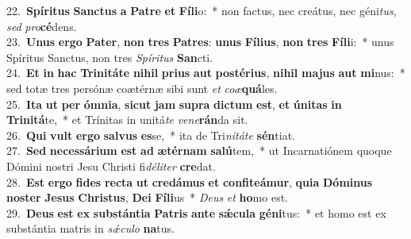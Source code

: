 {22.~}\textbf{Spí}\textbf{ri}\textbf{tus} \textbf{San}\textbf{ctus} \textbf{a} \textbf{Pa}\textbf{tre} \textbf{et} \textbf{Fí}\textbf{li}o:~* non factus, nec creátus, nec géni\textit{tus}, \textit{sed} \textit{pro}\textbf{cé}dens.\\
{23.~}\textbf{U}\textbf{nus} \textbf{er}\textbf{go} \textbf{Pa}\textbf{ter}, \textbf{non} \textbf{tres} \textbf{Pa}\textbf{tres}: \textbf{u}\textbf{nus} \textbf{Fí}\textbf{li}\textbf{us}, \textbf{non} \textbf{tres} \textbf{Fí}\textbf{li}i:~* unus Spíritus Sanctus, non tres \textit{Spí}\textit{ri}\textit{tus} \textbf{San}cti.\\
{24.~}\textbf{Et} \textbf{in} \textbf{hac} \textbf{Tri}\textbf{ni}\textbf{tá}\textbf{te} \textbf{ni}\textbf{hil} \textbf{pri}\textbf{us} \textbf{aut} \textbf{po}\textbf{sté}\textbf{ri}\textbf{us}, \textbf{ni}\textbf{hil} \textbf{ma}\textbf{jus} \textbf{aut} \textbf{mi}nus:~* sed totæ tres persónæ coætérnæ sibi sunt \textit{et} \textit{co}\textit{æ}\textbf{quá}les.\\
{25.~}\textbf{I}\textbf{ta} \textbf{ut} \textbf{per} \textbf{óm}\textbf{ni}\textbf{a}, \textbf{si}\textbf{cut} \textbf{jam} \textbf{su}\textbf{pra} \textbf{di}\textbf{ctum} \textbf{est}, \textbf{et} \textbf{ú}\textbf{ni}\textbf{tas} \textbf{in} \textbf{Tri}\textbf{ni}\textbf{tá}te,~* et Trínitas in unitá\textit{te} \textit{ve}\textit{ne}\textbf{rán}da sit.\\
{26.~}\textbf{Qui} \textbf{vult} \textbf{er}\textbf{go} \textbf{sal}\textbf{vus} \textbf{es}se,~* ita de Tri\textit{ni}\textit{tá}\textit{te} \textbf{sén}tiat.\\
{27.~}\textbf{Sed} \textbf{ne}\textbf{ces}\textbf{sá}\textbf{ri}\textbf{um} \textbf{est} \textbf{ad} \textbf{æ}\textbf{tér}\textbf{nam} \textbf{sa}\textbf{lú}tem,~* ut Incarnatiónem quoque Dómini nostri Jesu Christi fi\textit{dé}\textit{li}\textit{ter} \textbf{cre}dat.\\
{28.~}\textbf{Est} \textbf{er}\textbf{go} \textbf{fi}\textbf{des} \textbf{re}\textbf{cta} \textbf{ut} \textbf{cre}\textbf{dá}\textbf{mus} \textbf{et} \textbf{con}\textbf{fi}\textbf{te}\textbf{á}\textbf{mur}, \textbf{qui}\textbf{a} \textbf{Dó}\textbf{mi}\textbf{nus} \textbf{no}\textbf{ster} \textbf{Je}\textbf{sus} \textbf{Chri}\textbf{stus}, \textbf{De}\textbf{i} \textbf{Fí}\textbf{li}us~* \textit{De}\textit{us} \textit{et} \textbf{ho}mo est.\\
{29.~}\textbf{De}\textbf{us} \textbf{est} \textbf{ex} \textbf{sub}\textbf{stán}\textbf{ti}\textbf{a} \textbf{Pa}\textbf{tris} \textbf{an}\textbf{te} \textbf{sǽ}\textbf{cu}\textbf{la} \textbf{gé}\textbf{ni}tus:~* et homo est ex substántia matris in \textit{sǽ}\textit{cu}\textit{lo} \textbf{na}tus.\\
